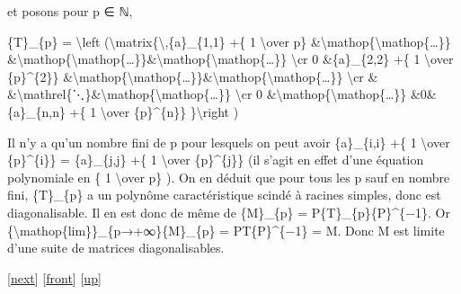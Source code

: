 \documentclass[]{article}
\begin{document}
et posons pour p ∈ ℕ,

\{T\}\_\{p\} = \textbackslash{}left
(\textbackslash{}matrix\{\textbackslash{},\{a\}\_\{1,1\} +\{ 1
\textbackslash{}over p\}
\&\textbackslash{}mathop\{\textbackslash{}mathop\{\ldots{}\}\}
\&\textbackslash{}mathop\{\textbackslash{}mathop\{\ldots{}\}\}\&\textbackslash{}mathop\{\textbackslash{}mathop\{\ldots{}\}\}
\textbackslash{}cr 0 \&\{a\}\_\{2,2\} +\{ 1 \textbackslash{}over
\{p\}\^{}\{2\}\}
\&\textbackslash{}mathop\{\textbackslash{}mathop\{\ldots{}\}\}\&\textbackslash{}mathop\{\textbackslash{}mathop\{\ldots{}\}\}
\textbackslash{}cr \&
\&\textbackslash{}mathrel\{⋱\}\&\textbackslash{}mathop\{\textbackslash{}mathop\{\ldots{}\}\}
\textbackslash{}cr 0
\&\textbackslash{}mathop\{\textbackslash{}mathop\{\ldots{}\}\}
\&0\&\{a\}\_\{n,n\} +\{ 1 \textbackslash{}over \{p\}\^{}\{n\}\}
\}\textbackslash{}right )

Il n'y a qu'un nombre fini de p pour lesquels on peut avoir
\{a\}\_\{i,i\} +\{ 1 \textbackslash{}over \{p\}\^{}\{i\}\} =
\{a\}\_\{j,j\} +\{ 1 \textbackslash{}over \{p\}\^{}\{j\}\} (il s'agit en
effet d'une équation polynomiale en \{ 1 \textbackslash{}over p\} ). On
en déduit que pour tous les p sauf en nombre fini, \{T\}\_\{p\} a un
polynôme caractéristique scindé à racines simples, donc est
diagonalisable. Il en est donc de même de \{M\}\_\{p\} =
P\{T\}\_\{p\}\{P\}\^{}\{−1\}. Or
\{\textbackslash{}mathop\{lim\}\}\_\{p→+∞\}\{M\}\_\{p\} =
PT\{P\}\^{}\{−1\} = M. Donc M est limite d'une suite de matrices
diagonalisables.

{[}\href{coursse16.html}{next}{]} {[}\href{coursse15.html}{front}{]}
{[}\href{coursch4.html\#coursse15.html}{up}{]}
\end{document}
